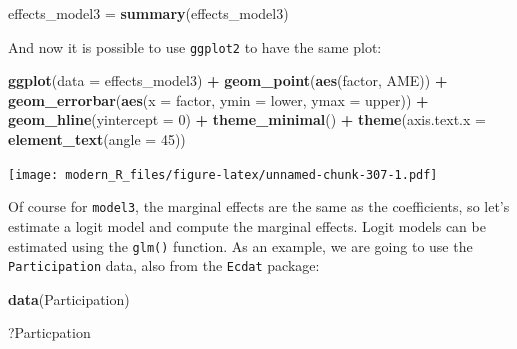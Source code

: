 \documentclass[]{gitbook}
\newenvironment{Shaded}{\begin{snugshade}}{\end{snugshade}}
\newcommand{\DataTypeTok}[1]{\textcolor[rgb]{0.13,0.29,0.53}{#1}}
\newcommand{\DecValTok}[1]{\textcolor[rgb]{0.00,0.00,0.81}{#1}}
\newcommand{\KeywordTok}[1]{\textcolor[rgb]{0.13,0.29,0.53}{\textbf{#1}}}
\newcommand{\NormalTok}[1]{#1}
\newcommand{\OperatorTok}[1]{\textcolor[rgb]{0.81,0.36,0.00}{\textbf{#1}}}
\newcommand{\StringTok}[1]{\textcolor[rgb]{0.31,0.60,0.02}{#1}}
\theoremstyle{definition}
\theoremstyle{definition}
\theoremstyle{definition}
\theoremstyle{remark}
\begin{document}
\begin{Shaded}
\begin{Highlighting}[]
\NormalTok{effects_model3 =}\StringTok{ }\KeywordTok{summary}\NormalTok{(effects_model3)}
\end{Highlighting}
\end{Shaded}

And now it is possible to use \texttt{ggplot2} to have the same plot:

\begin{Shaded}
\begin{Highlighting}[]
\KeywordTok{ggplot}\NormalTok{(}\DataTypeTok{data =}\NormalTok{ effects_model3) }\OperatorTok{+}
\StringTok{  }\KeywordTok{geom_point}\NormalTok{(}\KeywordTok{aes}\NormalTok{(factor, AME)) }\OperatorTok{+}
\StringTok{  }\KeywordTok{geom_errorbar}\NormalTok{(}\KeywordTok{aes}\NormalTok{(}\DataTypeTok{x =}\NormalTok{ factor, }\DataTypeTok{ymin =}\NormalTok{ lower, }\DataTypeTok{ymax =}\NormalTok{ upper)) }\OperatorTok{+}
\StringTok{  }\KeywordTok{geom_hline}\NormalTok{(}\DataTypeTok{yintercept =} \DecValTok{0}\NormalTok{) }\OperatorTok{+}
\StringTok{  }\KeywordTok{theme_minimal}\NormalTok{() }\OperatorTok{+}
\StringTok{  }\KeywordTok{theme}\NormalTok{(}\DataTypeTok{axis.text.x =} \KeywordTok{element_text}\NormalTok{(}\DataTypeTok{angle =} \DecValTok{45}\NormalTok{))}
\end{Highlighting}
\end{Shaded}

\texttt{[image: modern\_R\_files/figure-latex/unnamed-chunk-307-1.pdf]}

Of course for \texttt{model3}, the marginal effects are the same as the
coefficients, so let's estimate a logit model and compute the marginal
effects. Logit models can be estimated using the \texttt{glm()}
function. As an example, we are going to use the \texttt{Participation}
data, also from the \texttt{Ecdat} package:

\begin{Shaded}
\begin{Highlighting}[]
\KeywordTok{data}\NormalTok{(Participation)}
\end{Highlighting}
\end{Shaded}

\begin{Shaded}
\begin{Highlighting}[]
\NormalTok{?Particpation}
\end{Highlighting}
\end{Shaded}
\end{document}
